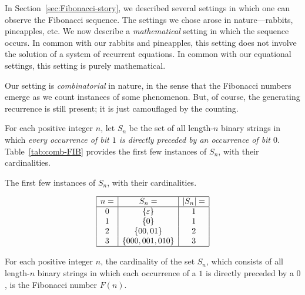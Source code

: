 In Section~\ref{sec:Fibonacci-story}, we described several settings in
which one can observe the Fibonacci sequence.  The settings we chose
arose in nature---rabbits, pineapples, etc.  We now describe a {\em
  mathematical} setting in which the sequence occurs.  In common with
our rabbits and pineapples, this setting does not involve the solution
of a system of recurrent equations.  In common with our equational
settings, this setting is purely mathematical.

Our setting is {\em combinatorial} in nature, in the sense that the
Fibonacci numbers emerge as we count instances of some phenomenon.
But, of course, the generating recurrence is still present; it is just
camouflaged by the counting.

For each positive integer $n$, let $S_n$ be the set of all length-$n$
binary strings in which {\em every occurrence of bit $1$ is directly
  preceded by an occurrence of bit $0$}.  Table~\ref{tab:comb-FIB}
provides the first few instances of $S_n$, with their cardinalities.
\begin{table}[hbt]
\label{tab:comb-FIB}
\caption{The first few instances of $S_n$, with their cardinalities.}
\[
\begin{array}{|c|c|c|}
\hline
n = & S_n =               & |S_n| = \\
\hline
0   & \{ \varepsilon\}    & 1 \\ 
1   & \{ 0 \}             & 1 \\
2   & \{ 00, 01 \}        & 2 \\
3   & \{ 000, 001, 010 \} & 3 \\
\hline
\end{array}
\]
\end{table}


\begin{prop}
\label{thm:FIBO-from-sparse-bitstrings}
For each positive integer $n$, the cardinality of the set $S_n$, which
consists of all length-$n$ binary strings in which each occurrence of
a $1$ is directly preceded by a $0$, is the Fibonacci number $F(n)$.
\end{prop}


